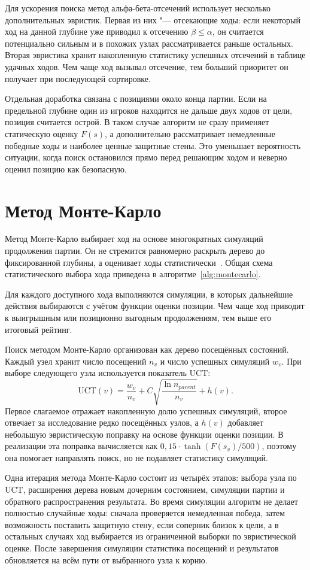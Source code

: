 \documentclass{csmathnotes}
\begin{document}
Для ускорения поиска метод альфа-бета-отсечений использует несколько дополнительных эвристик. Первая из них "--- отсекающие ходы: если некоторый ход на данной глубине уже приводил к отсечению $\beta \le \alpha$, он считается потенциально сильным и в похожих узлах рассматривается раньше остальных. Вторая эвристика хранит накопленную статистику успешных отсечений в таблице удачных ходов. Чем чаще ход вызывал отсечение, тем больший приоритет он получает при последующей сортировке.

Отдельная доработка связана с позициями около конца партии. Если на предельной глубине один из игроков находится не дальше двух ходов от цели, позиция считается острой. В таком случае алгоритм не сразу применяет статическую оценку $F(s)$, а дополнительно рассматривает немедленные победные ходы и наиболее ценные защитные стены. Это уменьшает вероятность ситуации, когда поиск остановился прямо перед решающим ходом и неверно оценил позицию как безопасную.

\section*{Метод Монте-Карло}

Метод Монте-Карло выбирает ход на основе многократных симуляций продолжения партии. Он не стремится равномерно раскрыть дерево до фиксированной глубины, а оценивает ходы статистически~\cite{Coulom:2006}. Общая схема статистического выбора хода приведена в алгоритме~\ref{alg:montecarlo}.

Для каждого доступного хода выполняются симуляции, в которых дальнейшие действия выбираются с учётом функции оценки позиции. Чем чаще ход приводит к выигрышным или позиционно выгодным продолжениям, тем выше его итоговый рейтинг.

Поиск методом Монте-Карло организован как дерево посещённых состояний. Каждый узел хранит число посещений $n_v$ и число успешных симуляций $w_v$. При выборе следующего узла используется показатель UCT:
\[
\mathrm{UCT}(v) =
\frac{w_v}{n_v}
+ C \sqrt{\frac{\ln n_{\textit{parent}}}{n_v}}
+ h(v).
\]
Первое слагаемое отражает накопленную долю успешных симуляций, второе отвечает за исследование редко посещённых узлов, а $h(v)$ добавляет небольшую эвристическую поправку на основе функции оценки позиции. В реализации эта поправка вычисляется как $0{,}15 \cdot \tanh(F(s_v) / 500)$, поэтому она помогает направлять поиск, но не подавляет статистику симуляций.

Одна итерация метода Монте-Карло состоит из четырёх этапов: выбора узла по UCT, расширения дерева новым дочерним состоянием, симуляции партии и обратного распространения результата. Во время симуляции алгоритм не делает полностью случайные ходы: сначала проверяется немедленная победа, затем возможность поставить защитную стену, если соперник близок к цели, а в остальных случаях ход выбирается из ограниченной выборки по эвристической оценке. После завершения симуляции статистика посещений и результатов обновляется на всём пути от выбранного узла к корню.
\end{document}
